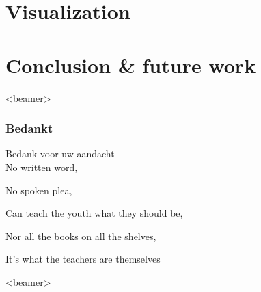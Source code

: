 \documentclass[english]{beamer}
\begin{document}
\section{Visualization}
\section{Conclusion \& future work}






\begin{frame}<beamer> 
  \frametitle{Bedankt}
	  {\huge \color{ugentyellow} Bedank voor uw aandacht}\\
	  No written word,
	  
	  No spoken plea,
	  
	  Can teach the youth what they should be,
	  
	  Nor all the books on all the shelves,
	  
	  It's what the teachers are themselves 
\end{frame}

\begin{frame}<beamer> 
	\footnotesize{\tableofcontents[hidesubsections]}
\end{frame}
\end{document}
